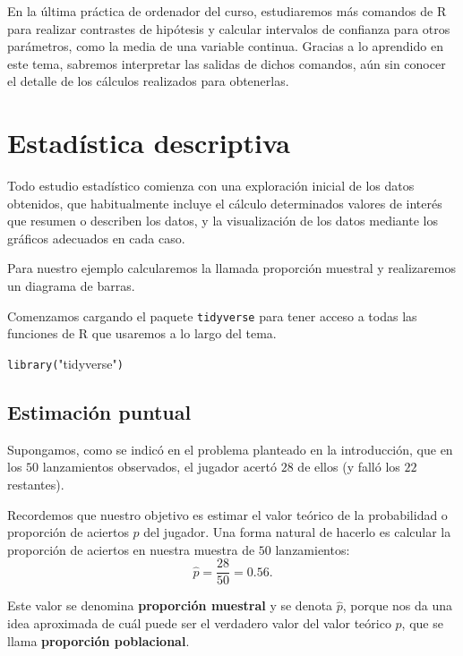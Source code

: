 \documentclass[
  notoc,
  nobib,
  degree=mec]{mnye}
\newenvironment{Shaded}{\begin{snugshade}}{\end{snugshade}}
\newcommand{\FunctionTok}[1]{\textcolor[rgb]{0.00,0.00,0.00}{#1}}
\newcommand{\NormalTok}[1]{#1}
\newcommand{\StringTok}[1]{\textcolor[rgb]{0.31,0.60,0.02}{#1}}
\renewcommand{\FunctionTok}[1]{\textcolor[rgb]{0.13,0.29,0.53}{\texttt{#1}}}
\renewcommand{\NormalTok}[1]{\texttt{#1}}
\begin{document}
En la última práctica de ordenador del curso, estudiaremos más comandos de \textsf{R} para realizar contrastes de hipótesis y calcular intervalos de confianza para otros parámetros, como la media de una variable continua. Gracias a lo aprendido en este tema, sabremos interpretar las salidas de dichos comandos, aún sin conocer el detalle de los cálculos realizados para obtenerlas.

\hypertarget{descriptive}{%
\section{Estadística descriptiva}\label{descriptive}}

Todo estudio estadístico comienza con una exploración inicial de los datos obtenidos, que habitualmente incluye el cálculo determinados valores de interés que resumen o describen los datos, y la visualización de los datos mediante los gráficos adecuados en cada caso.

Para nuestro ejemplo calcularemos la llamada proporción muestral y realizaremos un diagrama de barras.

Comenzamos cargando el paquete \texttt{tidyverse} para tener acceso a todas las funciones de \textsf{R} que usaremos a lo largo del tema.

\begin{Shaded}
\begin{Highlighting}[]
\FunctionTok{library}\NormalTok{(}\StringTok{"tidyverse"}\NormalTok{)}
\end{Highlighting}
\end{Shaded}

\hypertarget{point}{%
\subsection{Estimación puntual}\label{point}}

Supongamos, como se indicó en el problema planteado en la introducción, que en los \(50\) lanzamientos observados, el jugador acertó \(28\) de ellos (y falló los \(22\) restantes).

Recordemos que nuestro objetivo es estimar el valor teórico de la probabilidad o proporción de aciertos \(p\) del jugador. Una forma natural de hacerlo es calcular la proporción de aciertos en nuestra muestra de \(50\) lanzamientos: \[
 \hat{p} = \frac{28}{50} = 0.56.
\]

Este valor se denomina \textbf{proporción muestral} y se denota \(\widehat{p}\), porque nos da una idea aproximada de cuál puede ser el verdadero valor del valor teórico \(p\), que se llama \textbf{proporción poblacional}.
\end{document}
